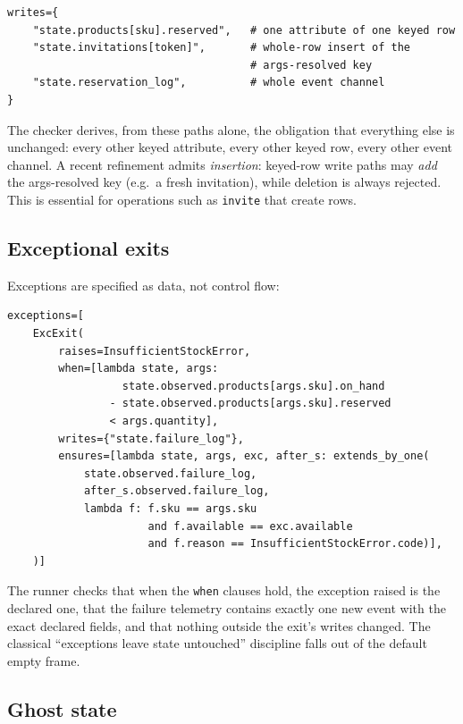 \documentclass[11pt,a4paper]{article}
\begin{document}
\begin{lstlisting}[style=python]
writes={
    "state.products[sku].reserved",   # one attribute of one keyed row
    "state.invitations[token]",       # whole-row insert of the
                                      # args-resolved key
    "state.reservation_log",          # whole event channel
}
\end{lstlisting}

The checker derives, from these paths alone, the obligation that
everything else is unchanged: every other keyed attribute, every other
keyed row, every other event channel.  A recent refinement admits
\emph{insertion}: keyed-row write paths may \emph{add} the
args-resolved key (e.g.\ a fresh invitation), while deletion is always
rejected.  This is essential for operations such as \texttt{invite}
that create rows.

\subsection{Exceptional exits}

Exceptions are specified as data, not control flow:

\begin{lstlisting}[style=python]
exceptions=[
    ExcExit(
        raises=InsufficientStockError,
        when=[lambda state, args:
                  state.observed.products[args.sku].on_hand
                - state.observed.products[args.sku].reserved
                < args.quantity],
        writes={"state.failure_log"},
        ensures=[lambda state, args, exc, after_s: extends_by_one(
            state.observed.failure_log,
            after_s.observed.failure_log,
            lambda f: f.sku == args.sku
                      and f.available == exc.available
                      and f.reason == InsufficientStockError.code)],
    )]
\end{lstlisting}

The runner checks that when the \texttt{when} clauses hold, the
exception raised is the declared one, that the failure telemetry
contains exactly one new event with the exact declared fields, and
that nothing outside the exit's writes changed.  The classical
``exceptions leave state untouched'' discipline falls out of the
default empty frame.

\subsection{Ghost state}
\end{document}
